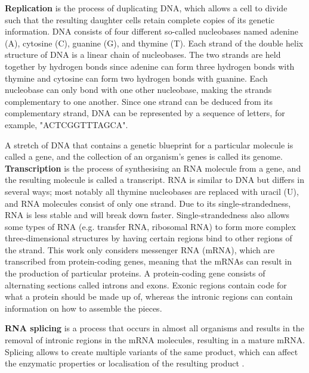 \textbf{Replication} is the process of duplicating DNA, which allows a cell to divide such that the resulting daughter cells retain complete copies of its genetic information. DNA consists of four different so-called nucleobases named adenine (A), cytosine (C), guanine (G), and thymine (T). Each strand of the double helix structure of DNA is a linear chain of nucleobases. The two strands are held together by hydrogen bonds since adenine can form three hydrogen bonds with thymine and cytosine can form two hydrogen bonds with guanine. Each nucleobase can only bond with one other nucleobase, making the strands complementary to one another. 
Since one strand can be deduced from its complementary strand, DNA can be represented by a sequence of letters, for example, "ACTCGGTTTAGCA". 

A stretch of DNA that contains a genetic blueprint for a particular molecule is called a gene, and the collection of an organism's genes is called its genome. \textbf{Transcription} is the process of synthesising an RNA molecule from a gene, and the resulting molecule is called a transcript. RNA is similar to DNA but differs in several ways; most notably all thymine nucleobases are replaced with uracil (U), and RNA molecules consist of only one strand.
Due to its single-strandedness, RNA is less stable and will break down faster. Single-strandedness also allows some types of RNA (e.g. transfer RNA, ribosomal RNA) to form more complex three-dimensional structures by having certain regions bind to other regions of the strand. This work only considers messenger RNA (mRNA), which are transcribed from protein-coding genes, meaning that the mRNAs can result in the production of particular proteins. A protein-coding gene consists of alternating sections called introns and exons. Exonic regions contain code for what a protein should be made up of, whereas the intronic regions can contain information on how to assemble the pieces.

\textbf{RNA splicing} is a process that occurs in almost all organisms and results in the removal of intronic regions in the mRNA molecules, resulting in a mature mRNA. 
Splicing allows to create multiple variants of the same product, which can affect the enzymatic properties or localisation of the resulting product \cite{kelemen_functionalternativesplicing_2013}.

